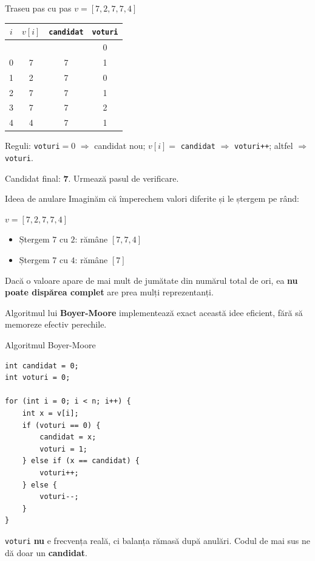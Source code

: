 \documentclass{beamer}
\begin{document}
\begin{frame}{Traseu pas cu pas \textemdash{} $v = [7, 2, 7, 7, 4]$}
  \begin{center}
  \begin{tabular}{cccc}
    \toprule
    $i$ & $v[i]$ & \texttt{candidat} & \texttt{voturi} \\
    \midrule
    \textemdash{} & \textemdash{} & \textemdash{} & 0 \\
    0 & 7 & 7 & 1 \\
    1 & 2 & 7 & 0 \\
    2 & 7 & 7 & 1 \\
    3 & 7 & 7 & 2 \\
    4 & 4 & 7 & 1 \\
    \bottomrule
  \end{tabular}
  \end{center}

  \smallskip
  Reguli: \texttt{voturi}$=0$ $\Rightarrow$ candidat nou; $v[i] =$ \texttt{candidat} $\Rightarrow$ \texttt{voturi++}; altfel $\Rightarrow$ \texttt{voturi\textendash{}\textendash{}}.

  \smallskip
  Candidat final: \textbf{7}. Urmează pasul de verificare.
\end{frame}

\begin{frame}{Ideea de anulare}
  Imaginăm că împerechem valori diferite și le ștergem pe rând:

  \smallskip
  $v = [7, 2, 7, 7, 4]$

  \begin{itemize}
    \item Ștergem $7$ cu $2$: rămâne $[7, 7, 4]$
    \item Ștergem $7$ cu $4$: rămâne $[7]$
  \end{itemize}

  \smallskip
  Dacă o valoare apare de mai mult de jumătate din numărul total de ori, ea \textbf{nu poate dispărea complet} \textemdash{} are prea mulți reprezentanți.

  \smallskip
  Algoritmul lui \textbf{Boyer-Moore} implementează exact această idee eficient, fără să memoreze efectiv perechile.
\end{frame}

\begin{frame}[fragile]{Algoritmul Boyer-Moore}
  \begin{lstlisting}
int candidat = 0;
int voturi = 0;

for (int i = 0; i < n; i++) {
    int x = v[i];
    if (voturi == 0) {
        candidat = x;
        voturi = 1;
    } else if (x == candidat) {
        voturi++;
    } else {
        voturi--;
    }
}
  \end{lstlisting}
  \lstinline|voturi| \textbf{nu} e frecvența reală, ci balanța rămasă după anulări. Codul de mai sus ne dă doar un \textbf{candidat}.
\end{frame}
\end{document}
